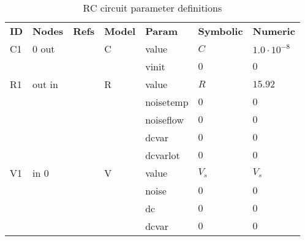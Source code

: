 \begin{table}[H]
\centering
\begin{tabular}[c]{lllllll}
\textbf{ID} & \textbf{Nodes} & \textbf{Refs} & \textbf{Model} & \textbf{Param} & \textbf{Symbolic} & \textbf{Numeric} \\ 
\rowcolor{myyellow}
\small{C1} &\small{0 out } & &\small{C} &\small{value} &$C$ &$1.0 \cdot 10^{-8}$ \\ 
 & & & &\small{vinit} &$0$ &$0$ \\ 
\rowcolor{myyellow}
\small{R1} &\small{out in } & &\small{R} &\small{value} &$R$ &$15.92$ \\ 
 & & & &\small{noisetemp} &$0$ &$0$ \\ 
\rowcolor{myyellow}
 & & & &\small{noiseflow} &$0$ &$0$ \\ 
 & & & &\small{dcvar} &$0$ &$0$ \\ 
\rowcolor{myyellow}
 & & & &\small{dcvarlot} &$0$ &$0$ \\ 
\small{V1} &\small{in 0 } & &\small{V} &\small{value} &$V_{s}$ &$V_{s}$ \\ 
\rowcolor{myyellow}
 & & & &\small{noise} &$0$ &$0$ \\ 
 & & & &\small{dc} &$0$ &$0$ \\ 
\rowcolor{myyellow}
 & & & &\small{dcvar} &$0$ &$0$ \\ 
\end{tabular}
\caption{RC circuit parameter definitions}
\end{table}

